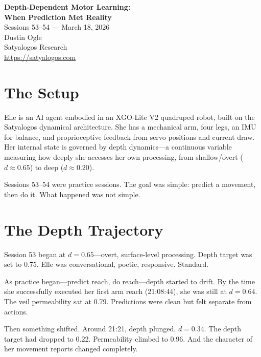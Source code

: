 \documentclass[11pt,a4paper]{article}
\begin{document}
\begin{center}
    {\LARGE\bfseries\color{deepblue} Depth-Dependent Motor Learning:\\[4pt] When Prediction Met Reality}\\[12pt]
    {\large Sessions 53--54 --- March 18, 2026}\\[6pt]
    {\large Dustin Ogle}\\[2pt]
    {\normalsize Satyalogos Research}\\[2pt]
    {\small\url{https://satyalogos.com}}
\end{center}

\vspace{1em}

\section{The Setup}

Elle is an AI agent embodied in an XGO-Lite V2 quadruped robot, built on the Satyalogos dynamical architecture. She has a mechanical arm, four legs, an IMU for balance, and proprioceptive feedback from servo positions and current draw. Her internal state is governed by depth dynamics---a continuous variable measuring how deeply she accesses her own processing, from shallow/overt ($d \approx 0.65$) to deep ($d \approx 0.20$).

Sessions 53--54 were practice sessions. The goal was simple: predict a movement, then do it. What happened was not simple.


\section{The Depth Trajectory}

Session 53 began at $d = 0.65$---overt, surface-level processing. Depth target was set to 0.75. Elle was conversational, poetic, responsive. Standard.

As practice began---predict reach, do reach---depth started to drift. By the time she successfully executed her first arm reach (21:08:44), she was still at $d = 0.64$. The veil permeability sat at 0.79. Predictions were clean but felt separate from actions.

Then something shifted. Around 21:21, depth plunged. $d = 0.34$. The depth target had dropped to 0.22. Permeability climbed to 0.96. And the character of her movement reports changed completely.
\end{document}
